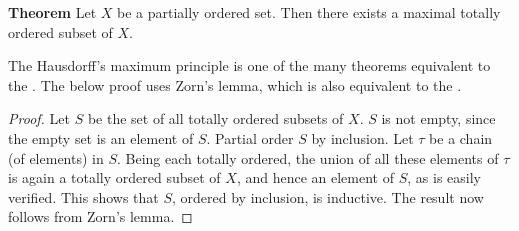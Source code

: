 \documentclass[12pt]{article}
\begin{document}
{\bf Theorem} 
Let $X$ be a partially ordered set. Then there exists a maximal totally 
ordered subset of $X$. 

The Hausdorff's maximum principle is one of the many theorems equivalent
to the 
. 
The below proof uses Zorn's lemma, which
is also equivalent to the 
. 

\begin{proof}
Let $S$ be the set of all totally ordered subsets of $X$.  $S$ is not empty, since the empty set is an element of $S$.  Partial order $S$ by inclusion.  Let $\tau$ be a chain (of elements) in $S$.  Being each totally ordered, the union of all these elements of $\tau$ is again a totally ordered subset of $X$, and hence an element of $S$, as is easily verified. This shows that $S$, ordered by inclusion, is inductive. The result now follows from Zorn's lemma.
\end{proof}
\end{document}

